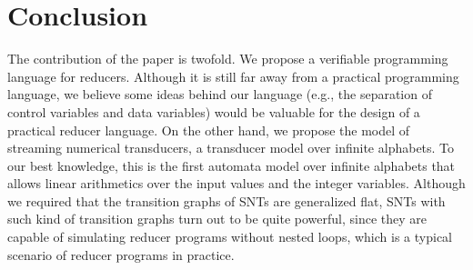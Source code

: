 	
\section{Conclusion}
\label{sec:conclusion}


The contribution of the paper is twofold. We propose a verifiable programming language for reducers. Although it is still far away from a practical programming language, we believe some ideas behind our language (e.g., the separation of control variables and data variables) would be valuable for the design of a practical reducer language. On the other hand, we propose the model of streaming numerical transducers, a transducer model over infinite alphabets. To our best knowledge, this is the first automata model over infinite alphabets that allows linear arithmetics over the input values and the integer variables. Although we required that the transition graphs of SNTs are generalized flat,  SNTs with such kind of transition graphs turn out to be quite powerful, since they are capable of simulating reducer programs without nested loops, which is a typical scenario of reducer programs in practice.



